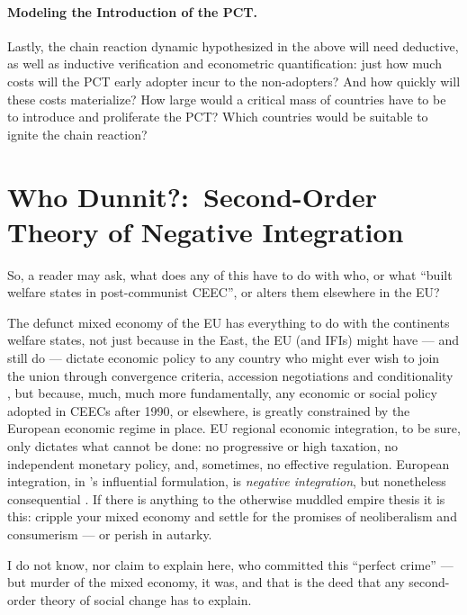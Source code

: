 \paragraph{Modeling the Introduction of the PCT.} Lastly, the chain reaction dynamic hypothesized in the above will need deductive, as well as inductive verification and econometric quantification:
just how much costs will the PCT early adopter incur to the non-adopters?
And how quickly will these costs materialize?
How large would a critical mass of countries have to be to introduce and proliferate the PCT?
Which countries would be suitable to ignite the chain reaction?
\clearpage

\section{Who Dunnit?:\ Second-Order Theory of Negative Integration} \label{sec:who-dunnit}

So, a reader may ask, what does any of this have to do with who, or what  ``built welfare states in post-communist \gls{CEEC}'', or alters them elsewhere in the \gls{EU}?

The defunct mixed economy of the \gls{EU} has everything to do with the continents welfare states, not just because in the East, the \gls{EU} (and \glspl{IFI}) might have --- and still do --- dictate economic policy to any country who might ever wish to join the union through convergence criteria, accession negotiations and conditionality \citep[55]{Bonker2006}, but because, much, much more fundamentally, any economic or social policy adopted in \glspl{CEEC} after 1990, or elsewhere, is greatly constrained by the European economic regime in place.
\gls{EU} regional economic integration, to be sure, only dictates what cannot be done:
no progressive or high taxation, no independent monetary policy, and, sometimes, no effective regulation.
European integration, in \citeauthor{Scharpf1997}'s influential formulation, is \emph{negative integration}, but nonetheless consequential \citep{Scharpf1997}.
If there is anything to the otherwise muddled empire thesis \citep{BeckGrande-2007-aa} it is this:
cripple your mixed economy and settle for the promises of neoliberalism and consumerism --- or perish in autarky.

I do not know, nor claim to explain here, who committed this ``perfect crime'' \citep{Galbraith2002a} --- but murder of the mixed economy, it was, and that is the deed that any second-order theory of social change has to explain.





